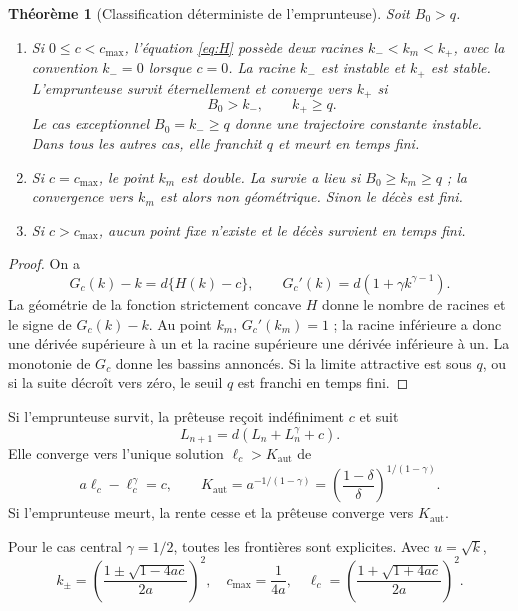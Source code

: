 \documentclass[11pt,a4paper]{article}
\newcommand{\1}{\mathbf 1}
\newtheorem{theorem}{Théorème}[section]
\theoremstyle{definition}
\theoremstyle{remark}
\begin{document}
\begin{theorem}[Classification déterministe de l'emprunteuse]
Soit $B_0>q$.
\begin{enumerate}
\item Si $0\leq c<c_{\max}$, l'équation \eqref{eq:H} possède deux
racines $k_-<k_m<k_+$, avec la convention $k_-=0$ lorsque $c=0$.
La racine $k_-$ est instable et $k_+$ est stable. L'emprunteuse survit
éternellement et converge vers $k_+$ si
\begin{equation}
B_0>k_-,\qquad k_+\geq q.
\label{eq:det-survival-condition}
\end{equation}
Le cas exceptionnel $B_0=k_-\geq q$ donne une trajectoire constante
instable. Dans tous les autres cas, elle franchit $q$ et meurt en temps
fini.
\item Si $c=c_{\max}$, le point $k_m$ est double. La survie a lieu si
$B_0\geq k_m\geq q$ ; la convergence vers $k_m$ est alors non
géométrique. Sinon le décès est fini.
\item Si $c>c_{\max}$, aucun point fixe n'existe et le décès survient en
temps fini.
\end{enumerate}
\end{theorem}
\begin{proof}
On a
\[
G_c(k)-k=d\{H(k)-c\},\qquad
G_c'(k)=d(1+\gamma k^{\gamma-1}).
\]
La géométrie de la fonction strictement concave $H$ donne le nombre de
racines et le signe de $G_c(k)-k$. Au point $k_m$, $G_c'(k_m)=1$ ; la
racine inférieure a donc une dérivée supérieure à un et la racine
supérieure une dérivée inférieure à un. La monotonie de $G_c$ donne les
bassins annoncés. Si la limite attractive est sous $q$, ou si la suite
décroît vers zéro, le seuil $q$ est franchi en temps fini.
\end{proof}

Si l'emprunteuse survit, la prêteuse reçoit indéfiniment $c$ et suit
\[
L_{n+1}=d(L_n+L_n^\gamma+c).
\]
Elle converge vers l'unique solution $\ell_c>K_{\mathrm{aut}}$ de
\begin{equation}
a\ell_c-\ell_c^\gamma=c,
\qquad
K_{\mathrm{aut}}=a^{-1/(1-\gamma)}
=\left(\frac{1-\delta}{\delta}\right)^{1/(1-\gamma)}.
\label{eq:lender-fixed}
\end{equation}
Si l'emprunteuse meurt, la rente cesse et la prêteuse converge vers
$K_{\mathrm{aut}}$.

Pour le cas central $\gamma=1/2$, toutes les frontières sont explicites.
Avec $u=\sqrt{k}$,
\begin{equation}
k_\pm=\left(\frac{1\pm\sqrt{1-4ac}}{2a}\right)^2,
\quad c_{\max}=\frac1{4a},
\quad
\ell_c=\left(\frac{1+\sqrt{1+4ac}}{2a}\right)^2.
\label{eq:sqrt-explicit}
\end{equation}
\end{document}
